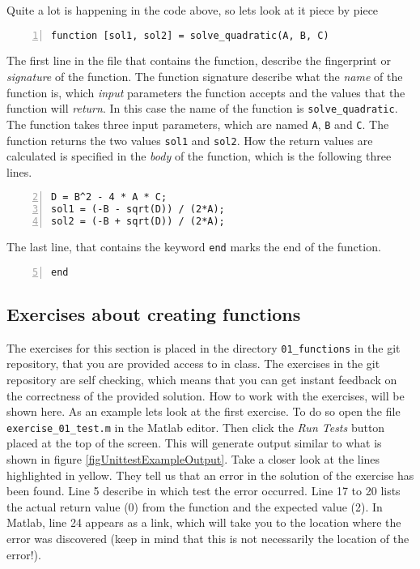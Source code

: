 Quite a lot is happening in the code above, so lets look at it 
piece by piece
\begin{lstlisting}[numbers=left]
function [sol1, sol2] = solve_quadratic(A, B, C)
\end{lstlisting}
The first line in the file that contains the function, describe
the fingerprint or \emph{signature} of the function.
The function signature describe what the \emph{name} of the function is, 
which \emph{input} parameters the function accepts and the values that 
the function will \emph{return}.
In this case the name of the function is \verb!solve_quadratic!.
The function takes three input parameters, which are named 
\verb!A!, \verb!B! and \verb!C!.
The function returns the two values \verb!sol1! and \verb!sol2!.
How the return values are calculated is specified in the \emph{body}
of the function, which is the following three lines.
\begin{lstlisting}[numbers=left, firstnumber=2]
D = B^2 - 4 * A * C;
sol1 = (-B - sqrt(D)) / (2*A);
sol2 = (-B + sqrt(D)) / (2*A);
\end{lstlisting}
The last line, that contains the keyword \verb!end! marks the end of the function.
\begin{lstlisting}[numbers=left, firstnumber=5]
end
\end{lstlisting}


\subsection{Exercises about creating functions}

The exercises for this section is placed in the directory 
\verb!01_functions! in the git repository, that you are provided access 
to in class.
The exercises in the git repository are self checking, which means that you 
can get instant feedback on the correctness of the provided solution.
How to work with the exercises, will be shown here. 
As an example lets look at the first exercise.
To do so open the file \verb!exercise_01_test.m! in the Matlab editor.
Then click the \emph{Run Tests} button placed at the top of the screen.
This will generate output similar to what is shown in figure 
\ref{figUnittestExampleOutput}.
Take a closer look at the lines highlighted in yellow.
They tell us that an error in the solution of the exercise has been found.
Line 5 describe in which test the error occurred.
Line 17 to 20 lists the actual return value (0) from the function and the expected value (2).
In Matlab, line 24 appears as a link, which will take you to the location 
where the error was discovered (keep in mind that this is not necessarily 
the location of the error!).


